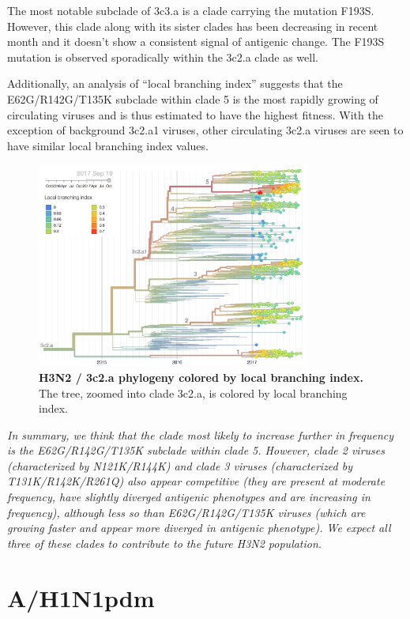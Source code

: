 \documentclass[11pt,oneside,letterpaper]{article}
\begin{document}
The most notable subclade of 3c3.a is a clade carrying the mutation
F193S. However, this clade along with its sister clades has been
decreasing in recent month and it doesn't show a consistent signal of
antigenic change. The F193S mutation is observed sporadically within
the 3c2.a clade as well.

Additionally, an analysis of ``local branching index'' \cite{neher2014predicting} suggests that the E62G/R142G/T135K subclade within clade 5 is the most rapidly growing of circulating viruses and is thus estimated to have the highest fitness.
With the exception of background 3c2.a1 viruses, other circulating 3c2.a viruses are seen to have similar local branching index values.

\begin{figure}[h!]
  \centering
  \includegraphics[width=0.8\textwidth]{../figures/sep-2017/h3n2_tree_lbi.png}
	\caption{\textbf{H3N2 / 3c2.a phylogeny colored by local branching index.}
  The tree, zoomed into clade 3c2.a, is colored by local branching index.
  }
  \label{h3n2_tree_dfreq}
\end{figure}

\textit{In summary, we think that the clade most likely to increase further in frequency is the E62G/R142G/T135K subclade within clade 5.
However, clade 2 viruses (characterized by N121K/R144K) and clade 3 viruses (characterized by T131K/R142K/R261Q) also appear competitive (they are present at moderate frequency, have slightly diverged antigenic phenotypes and are increasing in frequency), although less so than E62G/R142G/T135K viruses (which are growing faster and appear more diverged in antigenic phenotype).
We expect all three of these clades to contribute to the future H3N2 population.}


\clearpage
\section*{A/H1N1pdm}
\end{document}

